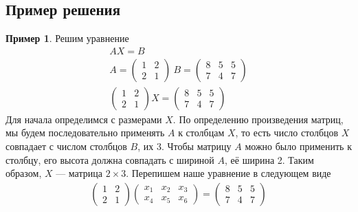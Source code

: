 \documentclass[]{article}
\theoremstyle{theorem}
\theoremstyle{definition}
\newtheorem{ex}{Пример}
\begin{document}
\subsection{Пример решения}
\begin{ex}
	Решим уравнение 
\begin{gather*}
	AX=B
	\\
	A=
	\begin{pmatrix}
		1 & 2
		\\
		2 & 1
	\end{pmatrix}
\
B=
	\begin{pmatrix}
	8 & 5 & 5
	\\
	7 & 4 & 7
\end{pmatrix}
\\
\begin{pmatrix}
	1 & 2
	\\
	2 & 1
\end{pmatrix}
X
=
	\begin{pmatrix}
	8 & 5 & 5
	\\
	7 & 4 & 7
\end{pmatrix}
\end{gather*}
Для начала определимся с размерами $X$. По определению произведения матриц, мы будем последовательно применять $A$ к столбцам $X$, то есть число столбцов $X$ совпадает с числом столбцов $B$, их 3. Чтобы матрицу $A$ можно было применить к столбцу, его высота должна совпадать с шириной $A$, её ширина 2. Таким образом, $X$ --- матрица $2\times 3$. Перепишем наше уравнение в следующем виде
\begin{gather*}
	\begin{pmatrix}
		1 & 2
		\\
		2 & 1
	\end{pmatrix}
	\begin{pmatrix}
	x_1 & x_2 & x_3
	\\
	x_4 & x_5 & x_6
\end{pmatrix}
	=
	\begin{pmatrix}
		8 & 5 & 5
		\\
		7 & 4 & 7
	\end{pmatrix}
\end{gather*}


\end{ex}
\end{document}
